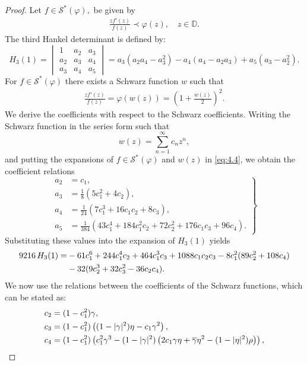 \documentclass[a4paper,12pt,reqno]{amsart} %
\numberwithin{equation}{section}
\theoremstyle{definition}
\begin{document}
\begin{proof}
Let $f\in \mathcal{S}^*(\varphi),$ be given by 
\begin{align*}
	\frac{z f'(z)}{f(z)}\prec \varphi(z), \quad z\in \mathbb{D}.
\end{align*}
 The third Hankel determinant is defined by:
\[
H_3(1)=
\begin{vmatrix}
	1 & a_2 & a_3 \\
	a_2 & a_3 & a_4 \\
	a_3 & a_4 & a_5
\end{vmatrix}
= a_3(a_2 a_4 - a_3^2)-a_4(a_4-a_2a_3)+a_5(a_3-a_2^2).
\]
For $f\in\mathcal{S}^*(\varphi)$ there exists a Schwarz function $w$ such that
\begin{align}\label{eq:4.4}
	\frac{z f'(z)}{f(z)}=\varphi(w(z))=\left(1+\frac{w(z)}{2}\right)^2.
\end{align}
We derive the coefficients with respect to the Schwarz coefficients.
Writing the Schwarz function in the series form such that
\[
w(z)=\sum_{n=1}^{\infty} c_n z^n,
\]
and putting the expansions of $f\in \mathcal{S}^*(\varphi)$ and $w(z)$ in \eqref{eq:4.4},
we obtain the coefficient relations
\begin{equation}
	\left.
	\begin{aligned}
		a_2 &= c_1,\\
		a_3 &= \frac{1}{8}\left(5c_1^2+4c_2\right),\\
		a_4 &= \frac{1}{24}\left(7c_1^3+16c_1c_2+8c_3\right),\\
		a_5 &= \frac{1}{384}\left(43c_1^4+184c_1^2c_2+72c_2^2+176c_1c_3+96c_4\right).
	\end{aligned}
	\right\}
\end{equation}
Substituting these values into the expansion of $H_3(1)$ yields
\begin{align}\label{eq:5.2}
	9216\, H_{3}(1)=&
	-61c_1^6 + 244c_1^4c_2 + 464c_1^3c_3 + 1088c_1c_2c_3
	- 8c_1^2(89c_2^2 + 108c_4)\notag \\
	\qquad
	&- 32(9c_2^3 + 32c_3^2 - 36c_2c_4).
\end{align}
We now use the relations between the coefficients of the Schwarz functions, which can be stated as:
\begin{align}\label{eq:5.3}
	c_2 &= (1-c_1^2)\gamma,\notag\\
	c_3 &= (1-c_1^2)\left((1-|\gamma|^2)\eta - c_1\gamma^2\right),\notag\\
	c_4 &= (1-c_1^2)\left(c_1^2\gamma^3 - (1-|\gamma|^2)\left(2c_1\gamma\eta + \overline{\gamma}\eta^2 - (1-|\eta|^2)\rho\right)\right),

\end{align}
\end{proof}
\end{document}
